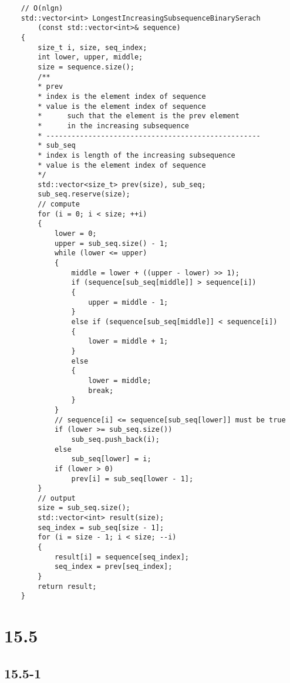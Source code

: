 \begin{verbatim}
    // O(nlgn)
    std::vector<int> LongestIncreasingSubsequenceBinarySerach
        (const std::vector<int>& sequence)
    {
        size_t i, size, seq_index;
        int lower, upper, middle;
        size = sequence.size();
        /**
        * prev
        * index is the element index of sequence
        * value is the element index of sequence 
        *      such that the element is the prev element 
        *      in the increasing subsequence
        * ---------------------------------------------------
        * sub_seq
        * index is length of the increasing subsequence
        * value is the element index of sequence
        */
        std::vector<size_t> prev(size), sub_seq;
        sub_seq.reserve(size);
        // compute
        for (i = 0; i < size; ++i)
        {
            lower = 0;
            upper = sub_seq.size() - 1;
            while (lower <= upper)
            {
                middle = lower + ((upper - lower) >> 1);
                if (sequence[sub_seq[middle]] > sequence[i])
                {
                    upper = middle - 1;
                }
                else if (sequence[sub_seq[middle]] < sequence[i])
                {
                    lower = middle + 1;
                }
                else
                {
                    lower = middle;
                    break;
                }
            }
            // sequence[i] <= sequence[sub_seq[lower]] must be true
            if (lower >= sub_seq.size())
                sub_seq.push_back(i);
            else
                sub_seq[lower] = i;
            if (lower > 0)
                prev[i] = sub_seq[lower - 1];
        }
        // output
        size = sub_seq.size();
        std::vector<int> result(size);
        seq_index = sub_seq[size - 1];
        for (i = size - 1; i < size; --i)
        {
            result[i] = sequence[seq_index];
            seq_index = prev[seq_index];
        }
        return result;
    }
\end{verbatim}

\section*{15.5}

\subsection*{15.5-1}

